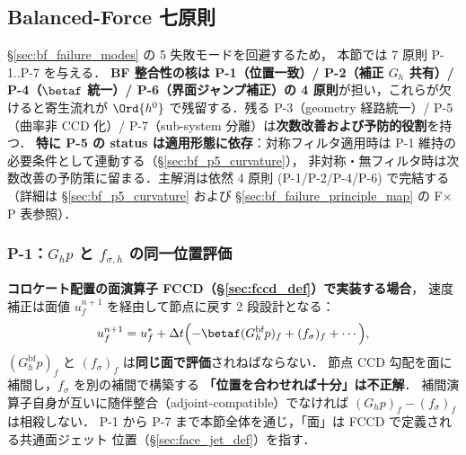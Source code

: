 %
%
\subsection{Balanced-Force 七原則}
\label{sec:bf_seven_principles}

§\ref{sec:bf_failure_modes} の 5 失敗モードを回避するため，
本節では 7 原則 P-1..P-7 を与える．
\textbf{BF 整合性の核は P-1（位置一致）/ P-2（補正 $G_h$ 共有）/ P-4（$\betaf$ 統一）/
P-6（界面ジャンプ補正）の 4 原則}が担い，これらが欠けると寄生流れが
$\Ord{h^0}$ で残留する．残る P-3（geometry 経路統一）/ P-5（曲率非 CCD 化）/
P-7（sub-system 分離）は\textbf{次数改善および予防的役割}を持つ．
\textbf{特に P-5 の status は適用形態に依存}：対称フィルタ適用時は
P-1 維持の必要条件として連動する（§\ref{sec:bf_p5_curvature}），
非対称・無フィルタ時は次数改善の予防策に留まる．主解消は依然 4 原則 (P-1/P-2/P-4/P-6) で完結する
（詳細は §\ref{sec:bf_p5_curvature} および §\ref{sec:bf_failure_principle_map} の F$\times$P 表参照）．

\subsubsection{P-1：$G_h p$ と $f_{\sigma,h}$ の同一位置評価}
\label{sec:bf_p1_location}

\textbf{コロケート配置の面演算子 FCCD（\S\ref{sec:fccd_def}）で実装する場合}，
速度補正は面値 $u_f^{n+1}$ を経由して節点に戻す 2 段設計となる：
\begin{equation}
  u_f^{n+1} = u_f^* + \Delta t\Bigl(
    -\betaf(G_h^\text{bf} p)_f + (f_\sigma)_f + \cdots
  \Bigr),
  \label{eq:bf_p1_corrector}
\end{equation}
$(G_h^\text{bf} p)_f$ と $(f_\sigma)_f$ は\textbf{同じ面で評価}されねばならない．
節点 CCD 勾配を面に補間し，$f_\sigma$ を別の補間で構築する
\textbf{「位置を合わせれば十分」は不正解}．
補間演算子自身が互いに随伴整合（adjoint-compatible）でなければ
$(G_h p)_f - (f_\sigma)_f$ は相殺しない．
P-1 から P-7 まで本節全体を通じ，「面」は FCCD で定義される共通面ジェット
位置（\S\ref{sec:face_jet_def}）を指す．


